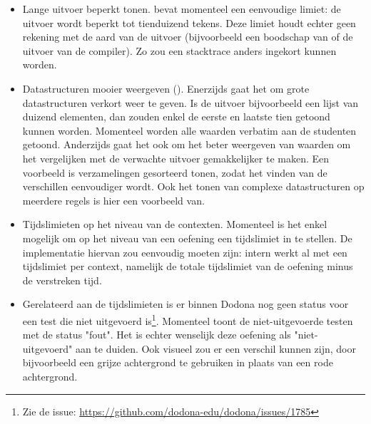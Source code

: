 \begin{itemize}
\begin{itemize}
    \end{itemize}
    \item Lange uitvoer beperkt tonen.
    \tested{} bevat momenteel een eenvoudige limiet: de uitvoer wordt beperkt tot tienduizend tekens.
    Deze limiet houdt echter geen rekening met de aard van de uitvoer (bijvoorbeeld een boodschap van \tested{} of de uitvoer van de compiler).
    Zo zou een stacktrace anders ingekort kunnen worden.
    \item Datastructuren mooier weergeven ().
    Enerzijds gaat het om grote datastructuren verkort weer te geven.
    Is de uitvoer bijvoorbeeld een lijst van duizend elementen, dan zouden enkel de eerste en laatste tien getoond kunnen worden.
    Momenteel worden alle waarden verbatim aan de studenten getoond.
    Anderzijds gaat het ook om het beter weergeven van waarden om het vergelijken met de verwachte uitvoer gemakkelijker te maken.
    Een voorbeeld is verzamelingen gesorteerd tonen, zodat het vinden van de verschillen eenvoudiger wordt.
    Ook het tonen van complexe datastructuren op meerdere regels is hier een voorbeeld van.
    \item Tijdslimieten op het niveau van de contexten.
    Momenteel is het enkel mogelijk om op het niveau van een oefening een tijdslimiet in te stellen.
    De implementatie hiervan zou eenvoudig moeten zijn: intern werkt \tested{} al met een tijdslimiet per context, namelijk de totale tijdslimiet van de oefening minus de verstreken tijd.
    \item Gerelateerd aan de tijdslimieten is er binnen Dodona nog geen status voor een test die niet uitgevoerd is\footnote{Zie de issue: \url{https://github.com/dodona-edu/dodona/issues/1785}}.
    Momenteel toont \tested{} de niet-uitgevoerde testen met de status "fout".
    Het is echter wenselijk deze oefening als "niet-uitgevoerd" aan te duiden.
    Ook visueel zou er een verschil kunnen zijn, door bijvoorbeeld een grijze achtergrond te gebruiken in plaats van een rode achtergrond.
\end{itemize}